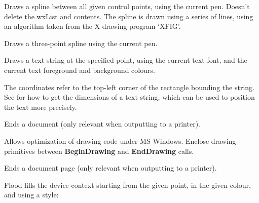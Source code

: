 Draws a spline between all given control points, using the current
pen.  Doesn't delete the wxList and contents. The spline is drawn
using a series of lines, using an algorithm taken from the X drawing
program `XFIG'.


Draws a three-point spline using the current pen.


\label{wxdcdrawtext}


Draws a text string at the specified point, using the current text font,
and the current text foreground and background colours.

The coordinates refer to the top-left corner of the rectangle bounding
the string. See  for how
to get the dimensions of a text string, which can be used to position the
text more precisely.

\label{wxdcenddoc}


Ends a document (only relevant when outputting to a printer).

\label{wxdcenddrawing}


Allows optimization of drawing code under MS Windows. Enclose
drawing primitives between {\bf BeginDrawing} and {\bf EndDrawing}\rtfsp
calls.

\label{wxdcendpage}


Ends a document page (only relevant when outputting to a printer).

\label{wxdcfloodfill}


Flood fills the device context starting from the given point, in the given colour,
and using a style:

